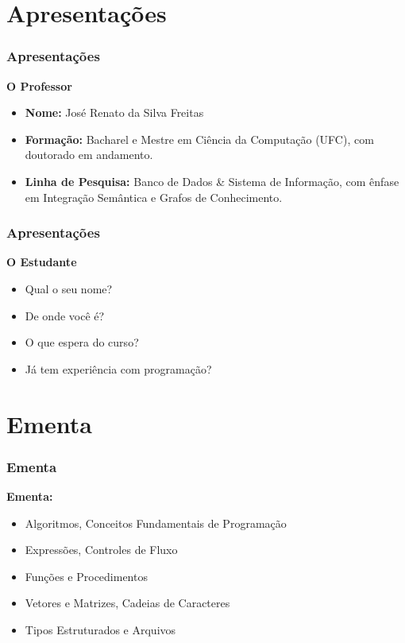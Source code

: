 \section{Apresentações}

\begin{frame}
	\frametitle{Apresentações}

	\textbf{O Professor}
	\begin{itemize}
		\item \textbf{Nome:} José Renato da Silva Freitas
		\item \textbf{Formação:} Bacharel e Mestre em Ciência da Computação (UFC), com doutorado em andamento.
		\item \textbf{Linha de Pesquisa:} Banco de Dados \& Sistema de Informação, com ênfase em Integração Semântica e Grafos de Conhecimento.
	\end{itemize}
\end{frame}


\begin{frame}
	\frametitle{Apresentações}

	\textbf{O Estudante}
	\begin{itemize}
		\item Qual o seu nome?
		\item De onde você é?
		\item O que espera do curso?
		\item Já tem experiência com programação?
	\end{itemize}
\end{frame}






\section{Ementa}
\begin{frame}
	\frametitle{Ementa}

	\textbf{Ementa:}
	\begin{itemize}
		\item Algoritmos, Conceitos Fundamentais de Programação
		\item Expressões, Controles de Fluxo
		\item Funções e Procedimentos
		\item Vetores e Matrizes, Cadeias de Caracteres
		\item Tipos Estruturados e Arquivos
	\end{itemize}
\end{frame}


